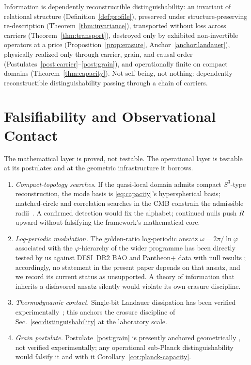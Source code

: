\documentclass[11pt,a4paper]{article}
\theoremstyle{definition}
\theoremstyle{remark}
\newcommand{\Sthree}{S^{3}}
\newcommand{\golden}{\varphi}
\begin{document}
\begin{tcolorbox}[colback=gray!4,colframe=gray!50,title=Core principle (Interpretation)]
Information is dependently reconstructible distinguishability: an invariant of relational
structure (Definition~\ref{def:profile}), preserved under structure-preserving re-description
(Theorem~\ref{thm:invariance}), transported without loss across carriers
(Theorem~\ref{thm:transport}), destroyed only by exhibited non-invertible operators at a price
(Proposition~\ref{prop:erasure}, Anchor~\ref{anchor:landauer}), physically realized only
through carrier, grain, and causal order (Postulates~\ref{post:carrier}--\ref{post:grain}), and
operationally finite on compact domains (Theorem~\ref{thm:capacity}).  Not self-being, not
nothing: dependently reconstructible distinguishability passing through a chain of carriers.
\end{tcolorbox}

\section{Falsifiability and Observational Contact}
\label{sec:falsifiability}

The mathematical layer is proved, not testable.  The operational layer is testable at its
postulates and at the geometric infrastructure it borrows.

\begin{enumerate}[label=(\arabic*)]
\item \emph{Compact-topology searches.}  If the quasi-local domain admits compact
$\Sthree$-type reconstruction, the mode basis is \eqref{eq:capacity}'s hyperspherical basis;
matched-circle and correlation searches in the CMB constrain the admissible
radii~\cite{Cornish1998,Planck2018}.  A confirmed detection would fix the alphabet; continued
nulls push $R$ upward without falsifying the framework's mathematical core.
\item \emph{Log-periodic modulation.}  The golden-ratio log-periodic ansatz
$\omega=2\pi/\ln\golden$ associated with the $\golden$-hierarchy of the wider programme has been
directly tested by us against DESI~DR2 BAO and Pantheon$+$ data with null results
\cite{BP2026null}; accordingly, no statement in the present paper depends on that ansatz, and we
record its current status as unsupported.  A theory of information that inherits a disfavored
ansatz silently would violate its own erasure discipline.
\item \emph{Thermodynamic contact.}  Single-bit Landauer dissipation has been verified
experimentally~\cite{Berut2012}; this anchors the erasure discipline of
Sec.~\ref{sec:distinguishability} at the laboratory scale.
\item \emph{Grain postulate.}  Postulate~\ref{post:grain} is presently anchored geometrically
\cite{BP2026ricci}, not verified experimentally; any operational sub-Planck distinguishability
would falsify it and with it Corollary~\ref{cor:planck-capacity}.
\end{enumerate}
\end{document}
